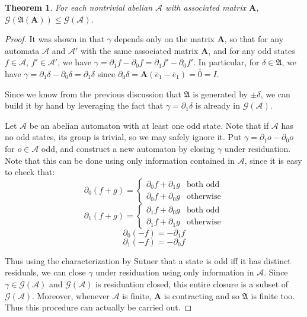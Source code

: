 \documentclass[final]{ws-ijac}
\newcommand{\A}{\mathcal{A}}
\newcommand{\G}{\mathcal{G}}
\renewcommand{\P}{\mathfrak{A}}
\newcommand{\2}{\textbf{2}}
\newcommand{\Am}{\textbf{A}}
\newcommand{\del}{\partial}
\newcommand{\e}{\bar{e}}
\newtheorem{thm}{Theorem}
\begin{document}
\begin{thm}
  For each nontrivial abelian $\A$ with associated matrix $\Am$, $\G(\P(\Am)) \leq \G(\A)$.
\end{thm}

\begin{proof}
  It was shown in \cite{Sutner18:abelian_automata} that $\gamma$ depends
  only on the matrix $\Am$, so that for any automata $\A$ and $\A'$ with the same
  associated matrix $\Am$, and for any odd states $f \in \A$, $f' \in \A'$, 
  we have $\gamma = \del_1 f - \del_0 f = \del_1 f' - \del_0 f'$. 
  In particular, for $\delta \in \P$, we have 
  $\gamma = \del_1 \delta - \del_0 \delta = \del_1 \delta$ since
  $\del_0 \delta = \Am(\e_1 - \e_1) = \bar{0} = I$. 

  Since we know from the previous discussion that $\P$ is generated by
  $\pm \delta$, we can build it by hand by leveraging the fact that 
  $\gamma = \del_1 \delta$ is already in $\G(\A)$.

  Let $\A$ be an abelian automaton with at least one odd state.
  Note that if $\A$ has no odd states, its group is trivial, so we may
  safely ignore it.
  Put $\gamma = \del_1 o - \del_0 o$ for $o \in \A$ odd, and construct
  a new automaton by closing $\gamma$ under residuation.
  Note that this can be done using only information contained in $\A$,
  since it is easy to check that:
  \[
    \del_0(f + g) = \begin{cases} \del_0 f + \del_1 g & \text{both odd}\\
                                  \del_0 f + \del_0 g & \text{otherwise}
                    \end{cases}
  \]
  \[
    \del_1(f + g) = \begin{cases} \del_1 f + \del_0 g & \text{both odd}\\
                                  \del_1 f + \del_1 g & \text{otherwise}
                    \end{cases}
  \]
  \[
    \del_0 (-f) = - \del_1 f
  \]
  \[
    \del_1 (-f) = - \del_0 f
  \]

  Thus using the characterization by Sutner \cite{Sutner18:abelian_automata}
  that a state is odd iff it has distinct residuals, we can close $\gamma$ 
  under residuation using only information in $\A$.
  Since $\gamma \in \G(\A)$ and $\G(\A)$ is residuation closed, 
  this entire closure is a subset of $\G(\A)$. Moreover, whenever $\A$ is 
  finite, $\Am$ is contracting and so $\P$ is finite too. Thus this 
  procedure can actually be carried out.


\end{proof}
\end{document}
